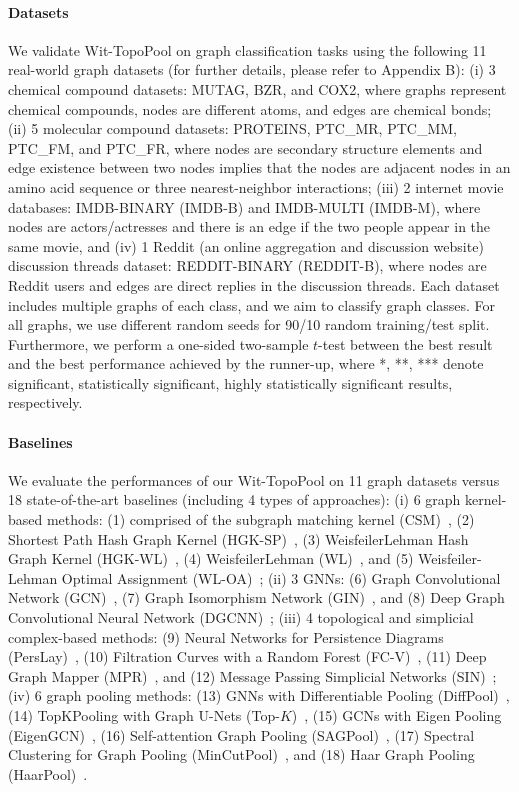 \documentclass[letterpaper]{article} %
\begin{document}
\paragraph{Datasets} We validate Wit-TopoPool on graph classification tasks using the following 11 real-world graph datasets (for further
details, please refer to Appendix B): (i) 3 chemical compound datasets: MUTAG, BZR, and COX2, where graphs represent chemical compounds, nodes are different atoms, and edges are chemical bonds; (ii) 5 molecular compound datasets: PROTEINS, PTC\_MR, PTC\_MM, PTC\_FM, and PTC\_FR, where nodes are secondary structure elements and edge existence between two nodes implies that the nodes are adjacent nodes in an amino acid sequence or three nearest-neighbor interactions; (iii) 2 internet movie databases: IMDB-BINARY (IMDB-B) and IMDB-MULTI (IMDB-M), where nodes are actors/actresses and there is an edge if the two people appear in the same movie, and (iv) 1 Reddit (an online aggregation and discussion website) discussion threads dataset: REDDIT-BINARY (REDDIT-B), where nodes are Reddit users and edges are direct replies in the discussion threads. Each dataset includes multiple graphs of each class, and we aim to classify graph classes. For all graphs, we use different random seeds for 90/10 random training/test split. Furthermore, we perform a one-sided two-sample $t$-test between the best result and the best performance achieved by the runner-up, where *, **, *** denote significant, statistically significant, highly statistically significant results, respectively.

\paragraph{Baselines} We evaluate the performances of our Wit-TopoPool on 11 graph datasets versus 18 state-of-the-art baselines (including 4 types of approaches): (i) 6 graph kernel-based methods: (1) comprised of the subgraph matching kernel (CSM)~\cite{kriege2012subgraph}, (2) Shortest
Path Hash Graph Kernel (HGK-SP)~\cite{morris2016faster}, (3) WeisfeilerLehman Hash
Graph Kernel (HGK-WL)~\cite{morris2016faster}, (4) WeisfeilerLehman (WL)~\cite{shervashidze2011weisfeiler}, and (5) Weisfeiler-Lehman Optimal Assignment (WL-OA)~\cite{kriege2016valid}; (ii) 3 GNNs: (6) Graph Convolutional Network (GCN)~\cite{kipf2016semi}, (7) Graph Isomorphism Network (GIN)~\cite{xu2018powerful}, and (8) Deep Graph Convolutional Neural Network (DGCNN)~\cite{zhang2018end}; (iii) 4 topological and simplicial complex-based methods: (9) Neural Networks for Persistence Diagrams (PersLay)~\cite{carriere2020perslay}, (10) Filtration Curves with a Random Forest (FC-V)~\cite{o2021filtration}, (11) Deep Graph Mapper (MPR)~\cite{bodnar2021deep}, and (12) Message Passing Simplicial Networks (SIN)~\cite{bodnar2021weisfeiler}; (iv) 6 graph pooling methods: (13) GNNs with Differentiable Pooling (DiffPool)~\cite{ying2018hierarchical}, (14) TopKPooling with Graph U-Nets (Top-$K$)~\cite{gao2019graph}, (15) GCNs with Eigen Pooling (EigenGCN)~\cite{ma2019graph}, (16) Self-attention Graph Pooling (SAGPool)~\cite{lee2019self}, (17) Spectral Clustering for Graph Pooling (MinCutPool)~\cite{bianchi2020spectral}, and (18) Haar Graph Pooling (HaarPool)~\cite{wang2020haar}.
\end{document}
